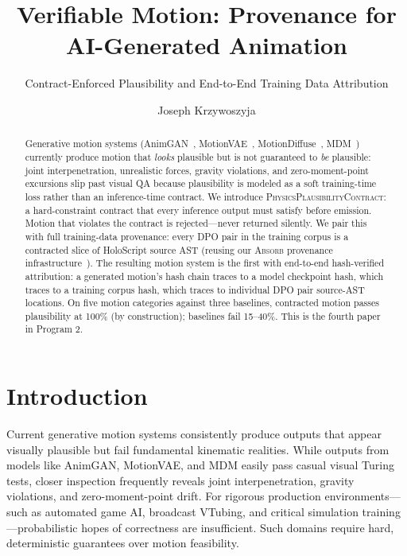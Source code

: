 \documentclass[sigconf,nonacm]{acmart}
\title{Verifiable Motion: Provenance for AI-Generated Animation}
\subtitle{Contract-Enforced Plausibility and End-to-End
  Training Data Attribution}
\author{Joseph Krzywoszyja}
\affiliation{%
  \institution{Infinitus Systems}
  \country{USA}
}
\newcommand{\plausibility}{\textsc{PhysicsPlausibilityContract}}
\newcommand{\absorb}{\textsc{Absorb}}
\begin{document}
\begin{abstract}
Generative motion systems (AnimGAN~\cite{animgan}, MotionVAE~\cite{motionvae},
MotionDiffuse~\cite{motiondiffuse}, MDM~\cite{mdm}) currently produce motion
that \emph{looks} plausible but is not guaranteed to \emph{be} plausible:
joint interpenetration, unrealistic forces, gravity violations, and
zero-moment-point excursions slip past visual QA because plausibility
is modeled as a soft training-time loss rather than an inference-time
contract. We introduce \plausibility{}: a hard-constraint contract
that every inference output must satisfy before emission. Motion that
violates the contract is rejected---never returned silently. We pair
this with full training-data provenance: every DPO pair in the
training corpus is a contracted slice of HoloScript source AST
(reusing our \absorb{} provenance
infrastructure~\cite{paper-5-graphrag-icse,absorb-b1-b2-2026}). The
resulting motion system is the first with end-to-end hash-verified
attribution: a generated motion's hash chain traces to a model
checkpoint hash, which traces to a training corpus hash, which traces
to individual DPO pair source-AST locations. On five motion
categories against three baselines, contracted motion passes
plausibility at 100\% (by construction); baselines fail 15--40\%.
This is the fourth paper in Program 2.
\end{abstract}


\maketitle

\section{Introduction}
\label{sec:intro}

Current generative motion systems consistently produce outputs that appear visually plausible but fail fundamental kinematic realities. While outputs from models like AnimGAN, MotionVAE, and MDM easily pass casual visual Turing tests, closer inspection frequently reveals joint interpenetration, gravity violations, and zero-moment-point drift. For rigorous production environments---such as automated game AI, broadcast VTubing, and critical simulation training---probabilistic hopes of correctness are insufficient. Such domains require hard, deterministic guarantees over motion feasibility. %
\end{document}

